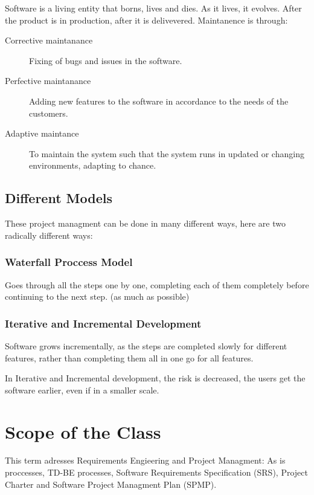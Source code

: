\documentclass[11pt,a4paper,twocolumn]{book}
\begin{document}
Software is a living entity that borns, lives and dies. As it lives, it evolves. After the product is in production, after it is delivevered. Maintanence is through:

\begin{description}
\item[Corrective maintanance] Fixing of bugs and issues in the software.
\item[Perfective maintanance] Adding new features to the software in accordance to the needs of the customers.
\item[Adaptive maintance] To maintain the system such that the system runs in updated or changing environments, adapting to chance.
\end{description}

\subsection{Different Models}

These project managment can be done in many different ways, here are two radically different ways:

\subsubsection{Waterfall Proccess Model}

Goes through all the steps one by one, completing each of them completely before continuing to the next step. (as much as possible)

\subsubsection{Iterative and Incremental Development}

Software grows incrementally, as the steps are completed slowly for different features, rather than completing them all in one go for all features.

In Iterative and Incremental development, the risk is decreased, the users get the software earlier, even if in a smaller scale.

\section{Scope of the Class}

This term adresses Requirements Engieering and Project Managment: As is proccesses, TD-BE processes, Software Requirements Specification (SRS), Project Charter and Software Project Managment Plan (SPMP).
\end{document}
